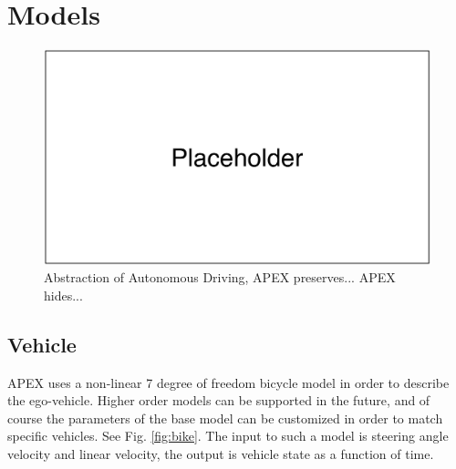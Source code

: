 \documentclass{easychair}
\theoremstyle{theorem}
\theoremstyle{remark}
\begin{document}
\section{Models}
\label{sect:model}
\begin{figure}
	\centering
	\includegraphics[scale=0.5]{figures/placeholder}
	\caption{Abstraction of Autonomous Driving, APEX preserves... APEX hides...}
\end{figure}
\subsection{Vehicle}
APEX uses a non-linear 7 degree of freedom bicycle model \cite{Rajamani2011} in order to describe the ego-vehicle. 
Higher order models can be supported in the future, and of course the parameters of the base model can be customized in order to match specific vehicles. 
See Fig. \ref{fig:bike}. 
The input to such a model is steering angle velocity and linear velocity, the output is vehicle state as a function of time. 
\end{document}
